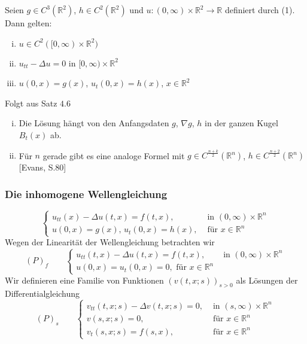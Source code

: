\begin{satz}
	Seien $ g \in C^3(\mathbb{R}^2)$, $h \in C^2(\mathbb{R}^2)$ und $u: (0,\infty) \times \mathbb{R}^2 \to \mathbb{R}$ definiert durch (1). Dann gelten:
	\begin{enumerate}[(i)]
		\item $u \in C^2([0,\infty) \times \mathbb{R}^2)$
		\item $u_{tt} - \Delta u = 0$ in $[0,\infty) \times \mathbb{R}^2$
		\item $u(0,x)=g(x)$, $u_t(0,x) = h(x)$, $x \in \mathbb{R}^2$
	\end{enumerate} 
\end{satz}
\begin{beweis}
	Folgt aus Satz $4.6$
\end{beweis}
\begin{bemerkung}
	\begin{enumerate}[(i)]
		\item Die Lösung hängt von den Anfangsdaten $g$, $ \nabla g$, $h$ in der ganzen Kugel $B_t(x)$ ab.
		\item Für $n$ gerade gibt es eine analoge Formel mit $g \in C^{\frac{n+k}{2}}(\mathbb{R}^n)$, $h \in C^{\frac{n+2}{2}}(\mathbb{R}^n)$ [Evans, S.80]
	\end{enumerate}
\end{bemerkung}
\subsubsection{Die inhomogene Wellengleichung} 
\label{ssub:die_inhomogene_wellengleichung}

\[
	\begin{cases}
		u_{tt}(x)- \Delta u(t,x) = f(t,x), &\text{ in }(0,\infty) \times \mathbb{R}^n\\
		u(0,x) = g(x), \, u_t(0,x) = h(x), &\text{ für }x \in \mathbb{R}^n
	\end{cases}
\]
Wegen der Linearität der Wellengleichung betrachten wir
\[
	(P)_f \qquad \begin{cases}
		u_{tt}(t,x) - \Delta u(t,x) = f(t,x), &\text{ in }(0,\infty) \times \mathbb{R}^n\\
		u(0,x) = u_t(0,x) = 0, \text{ für } x \in \mathbb{R}^n
	\end{cases}
\]
Wir definieren eine Familie von Funktionen $(v(t,x;s))_{s >0}$ als Lösungen der Differentialgleichung
\[
	(P)_s \qquad \begin{cases}
		v_{tt}(t,x;s)- \Delta v(t,x;s) = 0, &\text{ in }(s, \infty) \times \mathbb{R}^n\\ 
		v(s,x;s) = 0 ,&\text{ für } x \in \mathbb{R}^n \\
		v_t(s,x;s) = f(s,x) ,&\text{ für } x \in \mathbb{R}^n
	\end{cases}
\]

